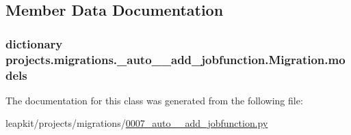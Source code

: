 \subsection{Member Data Documentation}
\hypertarget{classprojects_1_1migrations_1_10007__auto____add__jobfunction_1_1_migration_ad8c2b691d06f68b72d9971bb6a8f45cf}{
\subsubsection[{models}]{\setlength{\rightskip}{0pt plus 5cm}dictionary projects.\-migrations.\-\_\-auto\-\_\-\-\_\-add\-\_\-jobfunction.\-Migration.\-models\hspace{0.3cm}{\ttfamily [static]}}}\label{classprojects_1_1migrations_1_10007__auto____add__jobfunction_1_1_migration_ad8c2b691d06f68b72d9971bb6a8f45cf}


The documentation for this class was generated from the following file\-:\begin{DoxyCompactItemize}
\item 
leapkit/projects/migrations/\hyperlink{0007__auto____add__jobfunction_8py}{0007\-\_\-auto\-\_\-\-\_\-add\-\_\-jobfunction.\-py}\end{DoxyCompactItemize}

